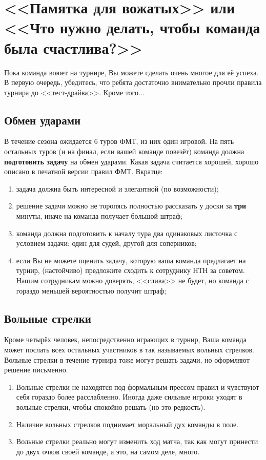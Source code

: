 \documentclass[12pt]{article}
\begin{document}
\newpage
\section*{<<Памятка для вожатых>> или <<Что нужно делать, чтобы команда была счастлива?>>}
Пока команда воюет на турнире, Вы можете сделать очень многое для её успеха. В первую очередь, убедитесь, что ребята достаточно внимательно прочли правила турнира до <<тест-драйва>>. Кроме того...
\subsection*{Обмен ударами}
В течение сезона ожидается 6 туров ФМТ, из них один игровой. На пять остальных туров (и на финал, если вашей команде повезёт) команда должна {\bf подготовить задачу} на обмен ударами. Какая задача считается хорошей, хорошо описано в печатной версии правил ФМТ. Вкратце:

\begin{enumerate}
	\item задача должна быть интересной и элегантной (по возможности);
	\item решение задачи можно не торопясь полностью рассказать у доски за {\bf три} минуты, иначе на команда получает большой штраф;
	\item команда должна подготовить к началу тура два одинаковых листочка с условием задачи: один для судей, другой для соперников;
	\item если Вы не можете оценить задачу, которую ваша команда предлагает на турнир, (настойчиво) предложите сходить к сотруднику НТН за советом. Нашим сотрудникам можно доверять, <<слива>> не будет, но команда с гораздо меньшей вероятностью получит штраф;
\end{enumerate}

\subsection*{Вольные стрелки}
Кроме четырёх человек, непосредственно играющих в турнир, Ваша команда может послать всех остальных участников в так называемых вольных стрелков. Вольные стрелки в течение турнира тоже могут решать задачи, но оформляют решение письменно. 
\begin{enumerate}
	\item Вольные стрелки не находятся под формальным прессом правил и чувствуют себя гораздо более расслабленно. Иногда даже сильные игроки уходят в вольные стрелки, чтобы спокойно решать (но это редкость).
	\item Наличие вольных стрелков поднимает моральный дух команды в поле.
	\item Вольные стрелки реально могут изменить ход матча, так как могут принести до двух очков своей команде, а это, на самом деле, много.
\end{enumerate}
\end{document}

